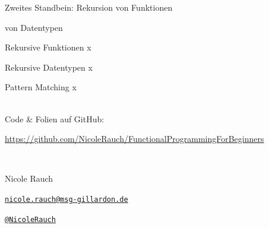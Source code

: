 \begin{frame}[fragile]{Zweites Standbein: Rekursion}
von Funktionen

von Datentypen

\end{frame}

\begin{frame}[fragile]{Rekursive Funktionen}
x
\end{frame}

\begin{frame}[fragile]{Rekursive Datentypen}
x
\end{frame}

\begin{frame}[fragile]{Pattern Matching}
x
\end{frame}


{
\begin{frame}{}

        ~\\[4em]
        Code \& Folien auf GitHub:
        \begin{center}
                \url{https://github.com/NicoleRauch/FunctionalProgrammingForBeginners}
        \end{center}

        ~\\[1em]
        \begin{block}{Nicole Rauch}
        \begin{description}[Twitterxx]
                \item[E-Mail]  \href{mailto:nicole.rauch@msg-gillardon.de}{\texttt{nicole.rauch@msg-gillardon.de}}
                \item[Twitter] \href{http://twitter.com/NicoleRauch}{\texttt{@NicoleRauch}}
        \end{description}
        \end{block}
\end{frame}
}
